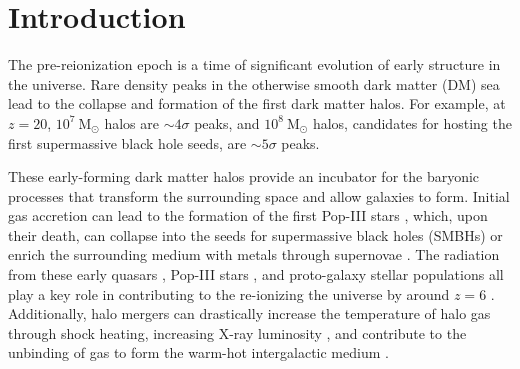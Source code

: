 
%
%

\section{Introduction}
\label{sec:2lpt--introduction}







The pre-reionization epoch is a time of significant evolution of early structure in the universe.  Rare density peaks in the otherwise smooth dark matter (DM) sea lead to the collapse and formation of the first dark matter halos.  For example, at $z = 20$, $10^{7}~\mathrm{M}_{\odot}$ halos are $\sim 4\sigma$ peaks, and $10^{8}~\mathrm{M}_{\odot}$ halos, candidates for hosting the first supermassive black hole seeds, are $\sim 5\sigma$ peaks.

These early-forming dark matter halos provide an incubator for the baryonic processes that transform the surrounding space and allow galaxies to form.  Initial gas accretion can lead to the formation of the first Pop-III stars \citep{1986MNRAS.221...53C, 1997ApJ...474....1T, 2000ApJ...540...39A, 2002Sci...295...93A}, which, upon their death, can collapse into the seeds for supermassive black holes (SMBHs) \citep{2001ApJ...551L..27M, 2003MNRAS.340..647I, 2009ApJ...701L.133A, 2012ApJ...754...34J} or enrich the surrounding medium with metals through supernovae \citep{2002ApJ...567..532H, 2003ApJ...591..288H}.  The radiation from these early quasars \citep{1987ApJ...321L.107S, 1999ApJ...514..648M, 2001AJ....122.2833F}, Pop-III stars \citep{1997ApJ...486..581G, 2003ApJ...584..621V, 2006ApJ...639..621A}, and proto-galaxy stellar populations \citep{2012ApJ...752L...5B, 2012MNRAS.423..862K} all play a key role in contributing to the re-ionizing the universe by around $z = 6$ \citep{2001PhR...349..125B}.  Additionally, halo mergers can drastically increase the temperature of halo gas through shock heating, increasing X-ray luminosity \citep{2009MNRAS.397..190S}, and contribute to the unbinding of gas to form the warm-hot intergalactic medium \citep{2008SSRv..134..141B, 2010MNRAS.405L..31S, 2012MNRAS.425.2974T}.




